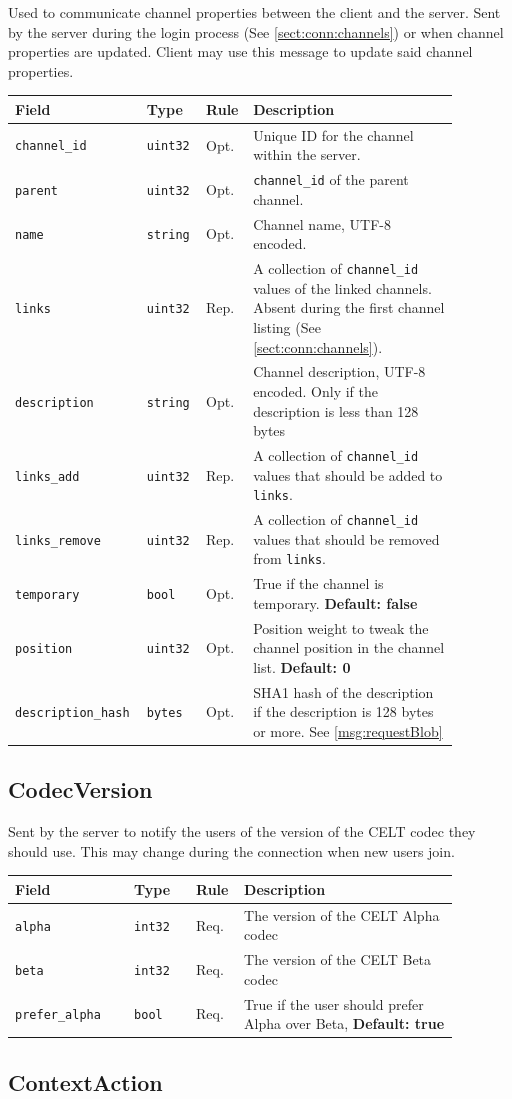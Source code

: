\documentclass[11pt]{article} %
\newenvironment{mumbleMessageEx}
{%
	\small
	\renewcommand\arraystretch{1.5}
	\begin{tabular}{p{0.25\linewidth}p{0.13\linewidth}p{0.05\linewidth}p{0.45\linewidth}}
	Field & Type & Rule & Description \\
	\hline
}
{%
	\end{tabular}
	\renewcommand\arraystretch{1.0}
}
\newcommand{\mumbleMessageExItem}[4]{ \texttt{#1} & \texttt{#2} & #3 & #4 \\ }
\begin{document}
Used to communicate channel properties between the client and the server. Sent by the server during the login process (See \ref{sect:conn:channels}) or when channel properties are updated. Client may use this message to update said channel properties.

\begin{mumbleMessageEx}
\mumbleMessageExItem{channel\_id}{uint32}{Opt.}{Unique ID for the channel within the server.}
\mumbleMessageExItem{parent}{uint32}{Opt.}{\texttt{channel\_id} of the parent channel.}
\mumbleMessageExItem{name}{string}{Opt.}{Channel name, UTF-8 encoded.}
\mumbleMessageExItem{links}{uint32}{Rep.}{A collection of \texttt{channel\_id} values of the linked channels. Absent during the first channel listing (See \ref{sect:conn:channels}).}
\mumbleMessageExItem{description}{string}{Opt.}{Channel description, UTF-8 encoded. Only if the description is less than 128 bytes}
\mumbleMessageExItem{links\_add}{uint32}{Rep.}{A collection of \texttt{channel\_id} values that should be added to \texttt{links}.}
\mumbleMessageExItem{links\_remove}{uint32}{Rep.}{A collection of \texttt{channel\_id} values that should be removed from \texttt{links}.}
\mumbleMessageExItem{temporary}{bool}{Opt.}{True if the channel is temporary. \textbf{Default: false}}
\mumbleMessageExItem{position}{uint32}{Opt.}{Position weight to tweak the channel position in the channel list. \textbf{Default: 0}}
\mumbleMessageExItem{description\_hash}{bytes}{Opt.}{SHA1 hash of the description if the description is 128 bytes or more. See \ref{msg:requestBlob}}
\end{mumbleMessageEx}

\subsection{CodecVersion}
\label{msg:codecVersion}

Sent by the server to notify the users of the version of the CELT codec they should use. This may change during the connection when new users join.

\begin{mumbleMessageEx}
\mumbleMessageExItem{alpha}{int32}{Req.}{The version of the CELT Alpha codec}
\mumbleMessageExItem{beta}{int32}{Req.}{The version of the CELT Beta codec}
\mumbleMessageExItem{prefer\_alpha}{bool}{Req.}{True if the user should prefer Alpha over Beta, \textbf{Default: true}}
\end{mumbleMessageEx}

\subsection{ContextAction}
\label{msg:contextAction}
\end{document}

